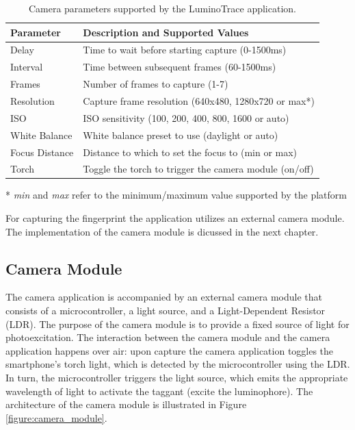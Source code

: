 \documentclass[thesis.tex]{subfiles}
\begin{document}
\begin{table}[ht]
	\caption{Camera parameters supported by the LuminoTrace application.} \label{table:camera-parameters}

	\begin{center}
	\begin{tabular}{| m{2.75cm} | m{9.75cm} |}

		\hline
		\textbf{Parameter}	& \textbf{Description and Supported Values} \\ \hline
		Delay				& Time to wait before starting capture (0-1500ms) \\
		\hline
		Interval 			& Time between subsequent frames (60-1500ms) \\
		\hline
		Frames 				& Number of frames to capture (1-7) \\
		\hline
		Resolution 			& Capture frame resolution (640x480, 1280x720 or max\footnotesize{*}) \\
		\hline
		ISO 				& ISO sensitivity (100, 200, 400, 800, 1600 or auto) \\
		\hline
		White Balance		& White balance preset to use (daylight or auto) \\
		\hline
		Focus Distance		& Distance to which to set the focus to (min or max) \\
		\hline
		Torch 				& Toggle the torch to trigger the camera module (on/off) \\
		\hline
	\end{tabular}
	\end{center}
	\scriptsize{*} \small{\emph{min} and \emph{max} refer to the minimum/maximum value supported by the platform}
\end{table}

For capturing the fingerprint the application utilizes an external camera module. The implementation of the camera module is dicussed in the next chapter.

\subsection{Camera Module}
\label{chapter:camera-module}

The camera application is accompanied by an external camera module that consists of a microcontroller, a light source, and a Light-Dependent Resistor (LDR). The purpose of the camera module is to provide a fixed source of light for photoexcitation. The interaction between the camera module and the camera application happens over air: upon capture the camera application toggles the smartphone's torch light, which is detected by the microcontroller using the LDR. In turn, the microcontroller triggers the light source, which emits the appropriate wavelength of light to activate the taggant (excite the luminophore). The architecture of the camera module is illustrated in Figure \ref{figure:camera_module}.
\end{document}
